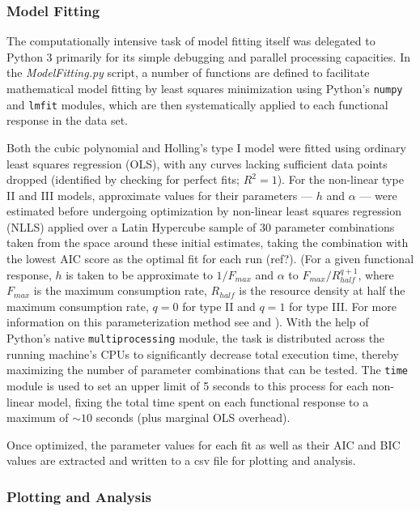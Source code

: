 \documentclass[11pt]{article}
\begin{document}
    \subsubsection{Model Fitting}
    The computationally intensive task of model fitting itself was delegated to Python 3 primarily for its simple debugging and parallel processing capacities. In the \emph{ModelFitting.py} script, a number of functions are defined to facilitate mathematical model fitting by least squares minimization using Python's \texttt{numpy} and \texttt{lmfit} modules, which are then systematically applied to each functional response in the data set. 
    
    Both the cubic polynomial and Holling's type I model were fitted using ordinary least squares regression (OLS), with any curves lacking sufficient data points dropped (identified by checking for perfect fits; $R^2=1$). For the non-linear type II and III models, approximate values for their parameters — $h$ and $\alpha$ — were estimated before undergoing optimization by non-linear least squares regression (NLLS) applied over a Latin Hypercube sample of 30 parameter combinations taken from the space around these initial estimates, taking the combination with the lowest AIC score as the optimal fit for each run (ref?). (For a given functional response, $h$ is taken to be approximate to $1/F_{max}$ and $\alpha$ to $F_{max}/R_{half}^{q+1}$, where $F_{max}$ is the maximum consumption rate,  $R_{half}$ is the resource density at half the maximum consumption rate, $q=0$ for type II and $q=1$ for type III. For more information on this parameterization method see \textcite{rosenbaum2018fitting} and \textcite{real1977kinetics}). With the help of Python's native \texttt{multiprocessing} module, the task is distributed across the running machine's CPUs to significantly decrease total execution time, thereby maximizing the number of parameter combinations that can be tested. The \texttt{time} module is used to set an upper limit of 5 seconds to this process for each non-linear model, fixing the total time spent on each functional response to a maximum of $\sim10$ seconds (plus marginal OLS overhead).
    
    Once optimized, the parameter values for each fit as well as their AIC and BIC values are extracted and written to a csv file for plotting and analysis.
    
    \subsubsection{Plotting and Analysis}
    
\end{document}
